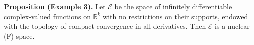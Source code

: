 \textbf{Proposition (Example 3).} Let $\mathcal{E}$ be the space of infinitely differentiable complex-valued functions on $\mathbb{R}^k$ with no restrictions on their supports, endowed with the topology of compact convergence in all derivatives. Then $\mathcal{E}$ is a nuclear (F)-space.
